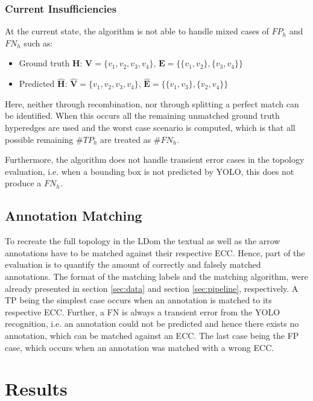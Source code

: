\subsubsection{Current Insufficiencies}
At the current state, the algorithm is not able to handle mixed cases of $FP_h$ and $FN_h$ such as:

\begin{itemize}
    \item Ground truth $\mathbf{H}$: $\mathbf{V} = \{v_1, v_2, v_3, v_4\}$, $\mathbf{E} = \{\{v_1, v_2\}, \{v_3, v_4\}\}$
    \item Predicted $\mathbf{\hat{H}}$: $\mathbf{\hat{V}} = \{v_1, v_2, v_3, v_4\}$, $\mathbf{\hat{E}} = \{\{v_1, v_3\}, \{v_2, v_4\}\}$
\end{itemize}

Here, neither through recombination, nor through splitting a perfect match can be identified.
When this occurs all the remaining unmatched ground truth hyperedges are used and the worst case scenario is computed, which is that all possible remaining $\#TP_h$ are treated as $\#FN_h$.

Furthermore, the algorithm does not handle transient error cases in the topology evaluation, i.e. when a bounding box is not predicted by \ac{YOLO}, this does not produce a $FN_h$.

\subsection{Annotation Matching}

To recreate the full topology in the \ac{LDom} the textual as well as the arrow annotations have to be matched against their respective \ac{ECC}.
Hence, part of the evaluation is to quantify the amount of correctly and falsely matched annotations.
The format of the matching labels and the matching algorithm, were already presented in section \ref{sec:data} and section \ref{sec:pipeline}, respectively.
A \ac{TP} being the simplest case occurs when an annotation is matched to its respective \ac{ECC}.
Further, a \ac{FN} is always a transient error from the YOLO recognition, i.e. an annotation could not be predicted and hence there exists no annotation, which can be matched against an \ac{ECC}.
The last case being the \ac{FP} case, which occurs when an annotation was matched with a wrong \ac{ECC}.

\section{Results}
\label{sec:evaluation_results}

